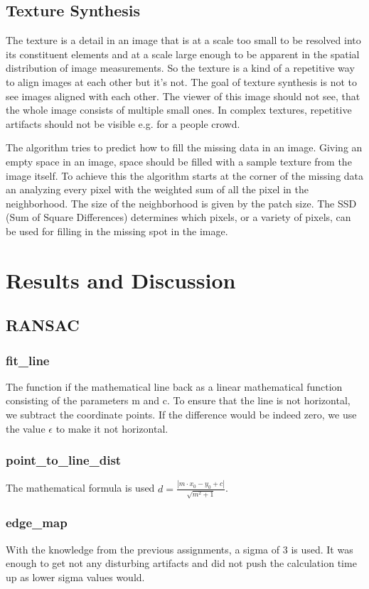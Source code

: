 \documentclass[12pt]{article}
\begin{document}
\subsection{Texture Synthesis}
The texture is a detail in an image that is at a scale too small to be resolved into its constituent elements and at a scale large enough to be apparent in the spatial distribution of image measurements. So the texture is a kind of a repetitive way to align images at each other but it's not. The goal of texture synthesis is not to see images aligned with each other. The viewer of this image should not see, that the whole image consists of multiple small ones. In complex textures, repetitive artifacts should not be visible e.g. for a people crowd.

The algorithm tries to predict how to fill the missing data in an image. Giving an empty space in an image, space should be filled with a sample texture from the image itself. To achieve this the algorithm starts at the corner of the missing data an analyzing every pixel with the weighted sum of all the pixel in the neighborhood. The size of the neighborhood is given by the patch size. The SSD (Sum of Square Differences) determines which pixels, or a variety of pixels, can be used for filling in the missing spot in the image.
\section{Results and Discussion}

\subsection{RANSAC}

\subsubsection{fit\_line}
The function if the mathematical line back as a linear mathematical function consisting of the parameters m and c. To ensure that the line is not horizontal, we subtract the coordinate points. If the difference would be indeed zero, we use the value $\epsilon$ to make it not horizontal.

\subsubsection{point\_to\_line\_dist}
The mathematical formula is used $d = \frac{|m \cdot x_{0} - y_{0} + c|}{\sqrt{m^2+1}}$.
\subsubsection{edge\_map}
With the knowledge from the previous assignments, a sigma of 3 is used. It was enough to get not any disturbing artifacts and did not push the calculation time up as lower sigma values would.
\end{document}
